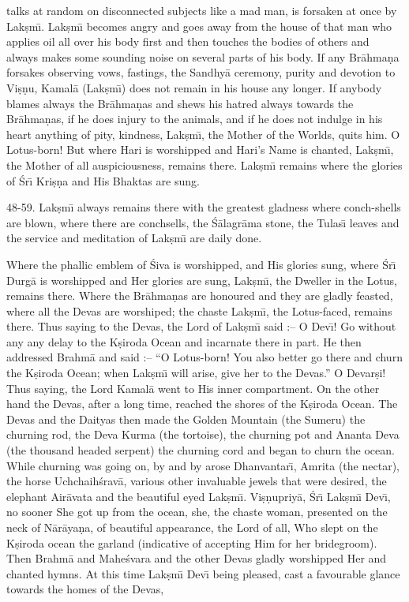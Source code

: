 talks at random on disconnected subjects like a mad man, is forsaken at once by Lak\d{s}m\={\i}. Lak\d{s}m\={\i} becomes angry and goes away from the house of that man who applies oil all over his body first and then touches the bodies of others and always makes some sounding noise on several parts of his body. If any Br\=ahma\d{n}a forsakes observing vows, fastings, the Sandhy\=a ceremony, purity and devotion to Vi\d{s}\d{n}u, Kamal\=a (Lak\d{s}m\={\i}) does not remain in his house any longer. If anybody blames always the Br\=ahma\d{n}as and shews his hatred always towards the Br\=ahma\d{n}as, if he does injury to the animals, and if he does not indulge in his heart anything of pity, kindness, Lak\d{s}m\={\i}, the Mother of the Worlds, quits him. O Lotus-born! But where Hari is worshipped and Hari's Name is chanted, Lak\d{s}m\={\i}, the Mother of all auspiciousness, remains there. Lak\d{s}m\={\i} remains where the glories of \'Sr\={\i} Kri\d{s}\d{n}a and His Bhaktas are sung.

48-59. Lak\d{s}m\={\i} always remains there with the greatest gladness where conch-shells are blown, where there are conchsells, the \'S\=alagr\=ama stone, the Tulas\={\i} leaves and the service and meditation of Lak\d{s}m\={\i} are daily done.

Where the phallic emblem of \'Siva is worshipped, and His glories sung, where \'Sr\={\i} Durg\=a is worshipped and Her glories are sung, Lak\d{s}m\={\i}, the Dweller in the Lotus, remains there. Where the Br\=ahma\d{n}as are honoured and they are gladly feasted, where all the Devas are worshiped; the chaste Lak\d{s}m\={\i}, the Lotus-faced, remains there. Thus saying to the Devas, the Lord of Lak\d{s}m\={\i} said :-- O Dev\={\i}! Go without any any delay to the K\d{s}iroda Ocean and incarnate there in part. He then addressed Brahm\=a and said :-- ``O Lotus-born! You also better go there and churn the K\d{s}iroda Ocean; when Lak\d{s}m\={\i} will arise, give her to the Devas.'' O Devar\d{s}i! Thus saying, the Lord Kamal\=a went to His inner compartment. On the other hand the Devas, after a long time, reached the shores of the K\d{s}iroda Ocean. The Devas and the Daityas then made the Golden Mountain (the Sumeru) the churning rod, the Deva Kurma (the tortoise), the churning pot and Ananta Deva (the thousand headed serpent) the churning cord and began to churn the ocean. While churning was going on, by and by arose Dhanvantar\={\i}, Amrita (the nectar), the horse Uchchaih\'srav\=a, various other invaluable jewels that were desired, the elephant Air\=avata and the beautiful eyed Lak\d{s}m\={\i}. Vi\d{s}\d{n}upriy\=a, \'Sr\={\i} Lak\d{s}m\={\i} Dev\={\i}, no sooner She got up from the ocean, she, the chaste woman, presented on the neck of N\=ar\=aya\d{n}a, of beautiful appearance, the Lord of all, Who slept on the K\d{s}iroda ocean the garland (indicative of accepting Him for her bridegroom). Then Brahm\=a and Mahe\'svara and the other Devas gladly worshipped Her and chanted hymns. At this time Lak\d{s}m\={\i} Dev\={\i} being pleased, cast a favourable glance towards the homes of the Devas,

